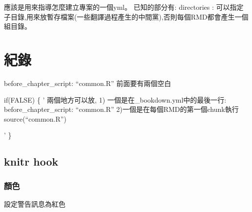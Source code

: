 \documentclass[]{book}
\newenvironment{Shaded}{\begin{snugshade}}{\end{snugshade}}
\newcommand{\AttributeTok}[1]{\textcolor[rgb]{0.77,0.63,0.00}{#1}}
\newcommand{\CharTok}[1]{\textcolor[rgb]{0.31,0.60,0.02}{#1}}
\newcommand{\ControlFlowTok}[1]{\textcolor[rgb]{0.13,0.29,0.53}{\textbf{#1}}}
\newcommand{\DataTypeTok}[1]{\textcolor[rgb]{0.13,0.29,0.53}{#1}}
\newcommand{\FunctionTok}[1]{\textcolor[rgb]{0.00,0.00,0.00}{#1}}
\newcommand{\KeywordTok}[1]{\textcolor[rgb]{0.13,0.29,0.53}{\textbf{#1}}}
\newcommand{\NormalTok}[1]{#1}
\newcommand{\OperatorTok}[1]{\textcolor[rgb]{0.81,0.36,0.00}{\textbf{#1}}}
\newcommand{\StringTok}[1]{\textcolor[rgb]{0.31,0.60,0.02}{#1}}
\theoremstyle{definition}
\theoremstyle{definition}
\theoremstyle{definition}
\theoremstyle{remark}
\begin{document}
應該是用來指導怎麼建立專案的一個yml。 已知的部分有: directories :
可以指定子目錄,用來放暫存檔案(一些翻譯過程產生的中間黨),否則每個RMD都會產生一個組目錄。

\begin{Shaded}
\end{Shaded}

\section{紀錄}

before\_chapter\_script: ``common.R'' 前面要有兩個空白

if(FALSE) \{ ' 兩個地方可以放, 1) 一個是在\_bookdown.yml中的最後一行:
before\_chapter\_script: ``common.R'' 2)一個是在每個RMD的第一個chunk執行
source(``common.R'')

' \}

\hypertarget{knitr-hook}{%
\subsection{knitr hook}\label{knitr-hook}}

\subsubsection{顏色}

設定警告訊息為紅色

\begin{Shaded}
\end{Shaded}
\end{document}
